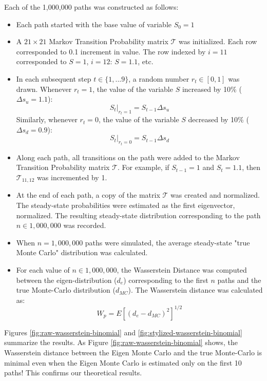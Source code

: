 \documentclass{wscpaperproc}
\theoremstyle{wsc}
\begin{document}
Each of the 1,000,000 paths was constructed as follows:
\begin{itemize}
    \item Each path started with the base value of variable $S_0=1$
    \item A $21\times 21$ Markov Transition Probability matrix $\mathcal{T}$ was initialized. Each row corresponded to 0.1 increment in value. The row indexed by $i=11$ corresponded to $S=1$, $i=12$: $S=1.1$, etc.   
    \item In each subsequent step $t\in\{1,...9\}$, a random number $r_t\in[0,1]$ was drawn. Whenever $r_t=1$, the value of the variable $S$ increased by 10\% ($\Delta s_u =1.1$): 
    \begin{equation}
        S_t|_{r_t=1} = S_{t-1} \Delta s_u
    \end{equation} 
    Similarly, whenever $r_t=0$, the value of the variable $S$ decreased by 10\% ($\Delta s_d = 0.9$): 
    \begin{equation}
        S_t|_{r_t=0} = S_{t-1} \Delta s_d
    \end{equation}

    \item Along each path, all transitions on the path were added to the Markov Transition Probability matrix $\mathcal{T}$. For example, if $S_{t-1}=1$ and $S_t=1.1$, then $\mathcal{T}_{11,12}$ was incremented by 1.   
    \item At the end of each path, a copy of the matrix $\mathcal{T}$ was created and normalized. The steady-state probabilities were estimated as the first eigenvector, normalized. The resulting steady-state distribution corresponding to the path $n\in 1,000,000$ was recorded.
    \item When $n=1,000,000$ paths were simulated, the average steady-state "true Monte Carlo" distribution was calculated.
    \item For each value of $n\in 1,000,000$, the Wasserstein Distance was computed between the eigen-distribution ($d_e$) corresponding to the first $n$ paths and the true Monte-Carlo distribution ($d_{MC}$). The Wasserstein distance was calculated as:
    \begin{equation}
        W_p = E[(d_e - d_{MC})^2]^{1/2}
    \end{equation}
\end{itemize}

    Figures \ref{fig:raw-wasserstein-binomial} and \ref{fig:stylized-wasserstein-binomial} summarize the results. As Figure \ref{fig:raw-wasserstein-binomial} shows, the Wasserstein distance between the Eigen Monte Carlo and the true Monte-Carlo is minimal even when the Eigen Monte Carlo is estimated only   on the first 10 paths! This confirms our theoretical results. 
    
\end{document}
